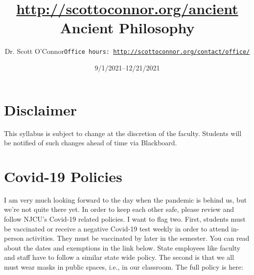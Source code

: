 \documentclass[article,oneside]{memoir}
\def\myauthor{Author}
\def\mytitle{Title}
\def\mycopyright{\myauthor}
\def\myweb{\href{http://scottoconnor.org/ancient}{http://scottoconnor.org/ancient}}
\def\myauthor{Dr. Scott O'Connor}
\def\mytitle{{\normalsize \myweb \newline} \HUGE Ancient Philosophy}
\begin{document}
\setsansfont[Mapping=tex-text]{Myriad Pro} 
\setmonofont[Mapping=tex-text,Scale=0.8]{Georgia} 

\def\ind{\hangindent=1 true cm\hangafter=1 \noindent}
\def\labelitemi{$\cdot$}


\title{\LARGE \mytitle}     
\author{\Large\myauthor \newline \footnotesize\texttt{\noindent Office hours: \href{http://scottoconnor.org/contact/office/}{http://scottoconnor.org/contact/office/}}}
\date{9/1/2021--12/21/2021}



\maketitle




%
%


\section{Disclaimer}
 This syllabus is subject to change at the discretion of the faculty. Students will be notified of such changes ahead of time via Blackboard. 

\section{Covid-19 Policies}
I am very much looking forward to the day when the pandemic is behind us, but we’re not quite there yet. In order to keep each other safe, please review and follow NJCU's Covid-19 related policies. I want to flag two. First, students must be vaccinated or receive a negative Covid-19 test weekly in order to attend in-person activities. They must be vaccinated by later in the semester. You can read about the dates and exemptions in the link below. State employees like faculty and staff have to follow a similar state wide policy. The second is that we all must wear masks in public spaces, i.e., in our classroom. The full policy is here:
\end{document}
